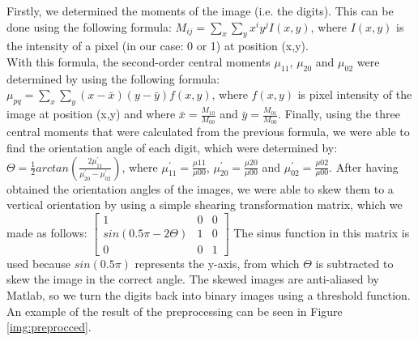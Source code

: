 \documentclass[11pt,twoside,a4paper]{article}
\begin{document}
Firstly, we determined the moments of the image (i.e. the digits). This can be done using the following formula:\newline
\newline
$M_{ij} = \sum_{x}^{} \sum_{y}^{} x^{i}y^{j}I(x,y)$,
\newline\newline
where $I(x,y)$ is the intensity of a pixel (in our case: 0 or 1) at position (x,y).\\
With this formula, the second-order central moments $\mu_{11}$, $\mu_{20}$ and $\mu_{02}$ were determined by using the following formula:
\newline\newline
$\mu_{pq} = \sum_{x}^{} \sum_{y}^{}(x-\bar{x})(y-\bar{y})f(x,y)$,
\newline\newline
where $f(x,y)$ is pixel intensity of the image at position (x,y) and where $\bar{x} = \frac{M_{10}}{M_{00}}$ and $\bar{y} = \frac{M_{01}}{M_{00}}$.\newline\newline
Finally, using the three central moments that were calculated from the previous formula, we were able to find the orientation angle of each digit, which were determined by:
\newline\newline
$\Theta = \frac{1}{2} arctan(\frac{2\mu_{11}^{'}}{\mu_{20}^{'} - \mu_{02}^{'}})$,
\newline\newline
where $\mu_{11}^{'} = \frac{\mu{11}}{\mu{00}}$, $\mu_{20}^{'} = \frac{\mu{20}}{\mu{00}}$ and $\mu_{02}^{'} = \frac{\mu{02}}{\mu{00}}$.
\newline\newline
After having obtained the orientation angles of the images, we were able to skew them to a vertical orientation by using a simple shearing transformation matrix, which we made as follows:
\newline\newline
$\begin{bmatrix}
       1                       & 0           & 0           \\[0.3em]
       sin(0.5\pi - 2\Theta)   & 1           & 0		   \\[0.3em]
       0                       & 0           & 1
\end{bmatrix}$
\newline\newline\newline
The sinus function in this matrix is used because $sin(0.5\pi)$ represents the y-axis, from which $\Theta$ is subtracted to skew the image in the correct angle. The skewed images are anti-aliased by Matlab, so we turn the digits back into binary images using a threshold function. An example of the result of the preprocessing can be seen in Figure \ref{img:preprocced}.
\end{document}
